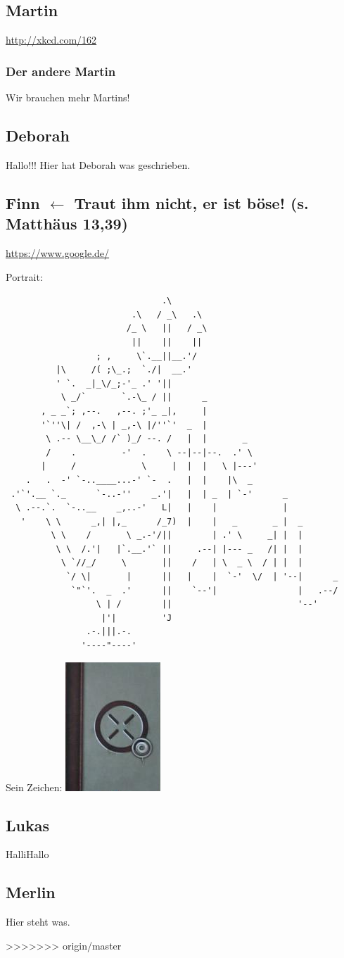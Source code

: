 \documentclass[12pt]{scrartcl}
\begin{document}
\subsection{Martin}
\url{http://xkcd.com/162}
\subsubsection{Der andere Martin}
Wir brauchen mehr Martins!

\subsection{Deborah}
Hallo!!! Hier hat Deborah was geschrieben.

\newpage
\subsection{Finn $\leftarrow$ Traut ihm nicht, er ist böse! (s. Matthäus 13,39)}
\url{https://www.google.de/}

Portrait:
\begin{verbatim}
                               .\
                         .\   / _\   .\
                        /_ \   ||   / _\
                         ||    ||    ||
                  ; ,     \`.__||__.'/
          |\     /( ;\_.;  `./|  __.'
          ' `.  _|_\/_;-'_ .' '||
           \ _/`       `.-\_ / ||      _
       , _ _`; ,--.   ,--. ;'_ _|,     |
       '`''\| /  ,-\ | _,-\ |/''`'  _  |
        \ .-- \__\_/ /` )_/ --. /   |  |       _
        /    .         -'  .    \ --|--|--.  .' \
       |     /             \     |  |  |   \ |---'
    .   .  -' `-..____...-' `-  .   |  |    |\  _
 .'`'.__ `._      `-..-''    _.'|   |  | _  | `-'      _
  \ .--.`.  `-..__    _,..-'   L|   |    |             |
   '    \ \      _,| |,_      /_7)  |    |   _       _ |  _
         \ \    /       \ _.-'/||        | .' \     _| |  |
          \ \  /.'|   |`.__.'` ||     .--| |--- _   /| |  |
           \ `//_/     \       ||    /   | \  _ \  / | |  |
            `/ \|       |      ||   |    |  `-'  \/  | '--|      _
             `"`'.  _  .'      ||    `--'|                |   .--/
                  \ | /        ||                         '--'
                   |'|         'J
                .-.|||.-.
               '----"----' 
\end{verbatim}

Sein Zeichen: \includegraphics{finnsZeichen.png}
\subsection{Lukas}
HalliHallo


\subsection{Merlin}
Hier steht was.

>>>>>>> origin/master
\end{document}
